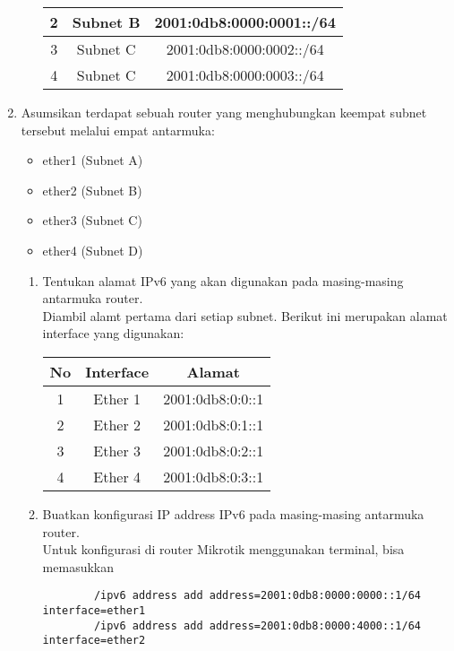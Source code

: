 \begin{enumerate}
\begin{enumerate}
\begin{table}[!h]
\begin{tabular}{|c|c|c|}
				2 & Subnet B & 2001:0db8:0000:0001::/64 \\ \hline
				3 & Subnet C & 2001:0db8:0000:0002::/64 \\ \hline
				4 & Subnet C & 2001:0db8:0000:0003::/64 \\ \hline
			\end{tabular}
		\end{table}
	\end{enumerate}
	\item Asumsikan terdapat sebuah router yang menghubungkan keempat subnet tersebut melalui empat antarmuka:
	\begin{itemize}
		\item ether1 (Subnet A)
		\item ether2 (Subnet B)
		\item ether3 (Subnet C)
		\item ether4 (Subnet D)
	\end{itemize}
	\begin{enumerate}
		\item Tentukan alamat IPv6 yang akan digunakan pada masing-masing antarmuka router. \\
		Diambil alamt pertama dari setiap subnet. Berikut ini merupakan alamat interface yang digunakan:
		\begin{table}[!h]
			\centering
			\begin{tabular}{|c|c|c|}
				\hline
				No & Interface & Alamat \\ \hline
				1 & Ether 1 & 2001:0db8:0:0::1 \\ \hline
				2 & Ether 2 & 2001:0db8:0:1::1 \\ \hline
				3 & Ether 3 & 2001:0db8:0:2::1 \\ \hline
				4 & Ether 4 & 2001:0db8:0:3::1 \\ \hline
			\end{tabular}
		\end{table}
		\item Buatkan konfigurasi IP address IPv6 pada masing-masing antarmuka router.\\
		Untuk konfigurasi di router Mikrotik menggunakan terminal, bisa memasukkan \\
		\begin{tcolorbox}[colback=gray!10, colframe=black, title=IPv6 Configuration, fonttitle=\bfseries]
		\begin{verbatim}
		/ipv6 address add address=2001:0db8:0000:0000::1/64 interface=ether1
		/ipv6 address add address=2001:0db8:0000:4000::1/64 interface=ether2

\end{verbatim}
\end{tcolorbox}
\end{enumerate}
\end{enumerate}
